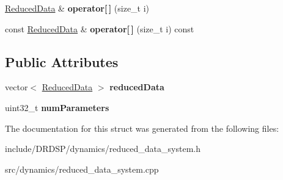 \begin{DoxyCompactItemize}
\item 
\hypertarget{struct_d_r_d_s_p_1_1_reduced_data_system_a483aaca2f16682806e08043b0407767e}{\hyperlink{struct_d_r_d_s_p_1_1_reduced_data}{Reduced\-Data} \& {\bfseries operator\mbox{[}$\,$\mbox{]}} (size\-\_\-t i)}\label{struct_d_r_d_s_p_1_1_reduced_data_system_a483aaca2f16682806e08043b0407767e}

\item 
\hypertarget{struct_d_r_d_s_p_1_1_reduced_data_system_aa14bf1bc623695cc20f1b4187ce0374b}{const \hyperlink{struct_d_r_d_s_p_1_1_reduced_data}{Reduced\-Data} \& {\bfseries operator\mbox{[}$\,$\mbox{]}} (size\-\_\-t i) const }\label{struct_d_r_d_s_p_1_1_reduced_data_system_aa14bf1bc623695cc20f1b4187ce0374b}

\end{DoxyCompactItemize}
\subsection*{Public Attributes}
\begin{DoxyCompactItemize}
\item 
\hypertarget{struct_d_r_d_s_p_1_1_reduced_data_system_ae4b8454c60cadde78da603168aa840f4}{vector$<$ \hyperlink{struct_d_r_d_s_p_1_1_reduced_data}{Reduced\-Data} $>$ {\bfseries reduced\-Data}}\label{struct_d_r_d_s_p_1_1_reduced_data_system_ae4b8454c60cadde78da603168aa840f4}

\item 
\hypertarget{struct_d_r_d_s_p_1_1_reduced_data_system_a18caccb6ac437c79aeb23e8b6c57389c}{uint32\-\_\-t {\bfseries num\-Parameters}}\label{struct_d_r_d_s_p_1_1_reduced_data_system_a18caccb6ac437c79aeb23e8b6c57389c}

\end{DoxyCompactItemize}


The documentation for this struct was generated from the following files\-:\begin{DoxyCompactItemize}
\item 
include/\-D\-R\-D\-S\-P/dynamics/reduced\-\_\-data\-\_\-system.\-h\item 
src/dynamics/reduced\-\_\-data\-\_\-system.\-cpp\end{DoxyCompactItemize}
